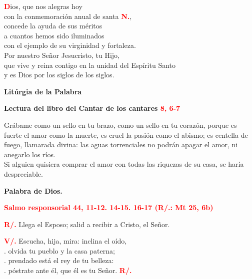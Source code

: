 \documentclass[12pt, letterpaper]{report}
\begin{document}
\lettrine[lines=1]{\bfseries \textcolor{red}{D}}{}\Large {ios,
que nos alegras hoy \\
con la conmemoraci\'on anual de santa {\bfseries \textcolor{red}{N.}}, \\
concede la ayuda de sus m\'eritos \\
a cuantos hemos sido iluminados \\
con el ejemplo de su virginidad y fortaleza. \\
Por nuestro Se\~nor Jesucristo, tu Hijo, \\
que vive y reina contigo en la unidad del Esp\'iritu Santo \\
y es Dios por los siglos de los siglos.}

\newpage

\begin{center}
\Huge {\bfseries Lit\'urgia de la Palabra}
\end{center}

\Large {\bfseries Lectura del libro del Cantar de los cantares \hspace{1cm} \textcolor{red}{8, 6-7}} \newline

\Large Gr\'abame como un sello en tu brazo, como un sello en tu coraz\'on, porque es fuerte el amor como la muerte, es cruel la pasi\'on como el abismo; es centella de fuego, llamarada divina: las aguas torrenciales no podr\'an apagar el amor, ni anegarlo los r\'ios. \\
Si alguien quisiera comprar el amor con todas las riquezas de su casa, se har\'ia despreciable. \newline

{\bfseries Palabra de Dios.} \newline


\Large {\bfseries \textcolor{red}{Salmo responsorial \hspace{1cm} 44, 11-12. 14-15. 16-17 (R/.: Mt 25, 6b)}} \newline

\Large {\bfseries \textcolor{red}{R/.}} \hspace{1cm} Llega el Esposo; salid a recibir a Cristo, el Se\~nor. \newline

{\bfseries \textcolor{red}{V/.}} \hspace{1cm} Escucha, hija, mira: inclina el o\'ido, \\
. \hspace{2.5cm} olvida tu pueblo y la casa paterna; \\
. \hspace{2.5cm} prendado est\'a el rey de tu belleza: \\
. \hspace{2.5cm} p\'ostrate ante \'el, que \'el es tu Se\~nor. \hspace{1cm} {\bfseries \textcolor{red}{R/.}} \newline
\end{document}
